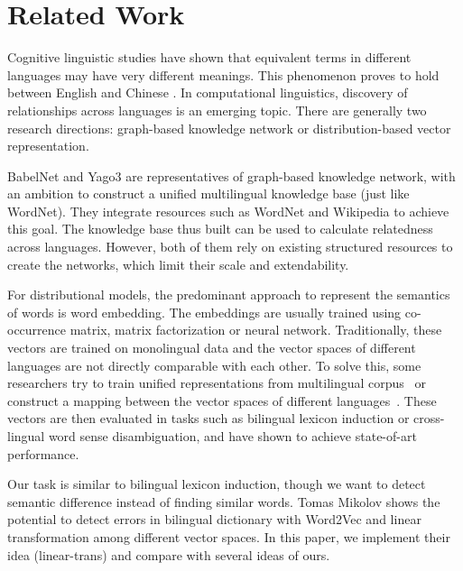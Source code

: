 \section{Related Work}
\label{sec:related}
Cognitive linguistic studies \cite{kovecses2006language} have shown that equivalent terms in different languages may have very different meanings. This phenomenon proves to hold between English and Chinese \cite{chen2007chinese,tavassoli1999temporal,krifka199511}.  In computational linguistics, discovery of relationships across languages is an emerging topic. There are generally two research directions: graph-based knowledge network or distribution-based vector representation. 

BabelNet\cite{Navigli:2012dn} and Yago3\cite{mahdisoltani2014yago3} are representatives of graph-based knowledge network, with an ambition 
to construct a unified multilingual knowledge base (just like WordNet). They 
integrate resources such as WordNet and Wikipedia to achieve 
this goal. The knowledge base thus built can be used to 
calculate relatedness across languages. However, both of them 
rely on existing structured resources to create the networks, 
which limit their scale and extendability.

For distributional models, the predominant approach to 
represent the semantics of words is word embedding. 
The embeddings are usually trained 
using co-occurrence matrix, 
matrix factorization\cite{lebret2013word,levy2014neural,li2015word} or 
neural network\cite{Mikolov2013distributed}. 
Traditionally, these vectors are trained on monolingual data and 
the vector spaces of different languages are not directly comparable 
with each other. To solve this, some researchers try to train 
unified representations from multilingual 
corpus~\cite{Klementiev:2012uk,hermann2014multilingual,Vulic:2015to} 
or construct a mapping between the vector spaces of 
different languages~\cite{Mikolov:2013tp}. 
These vectors are then evaluated 
in tasks such as bilingual lexicon induction or cross-lingual 
word sense disambiguation, and have shown to achieve 
state-of-art performance.

Our task is similar to bilingual lexicon induction, 
though we want to detect semantic difference instead of 
finding similar words. Tomas Mikolov\cite{Mikolov:2013tp} 
shows the potential to detect errors 
in bilingual dictionary with Word2Vec and linear transformation among 
different vector spaces. In this paper, we implement their idea 
(linear-trans) and compare with several ideas of ours.
